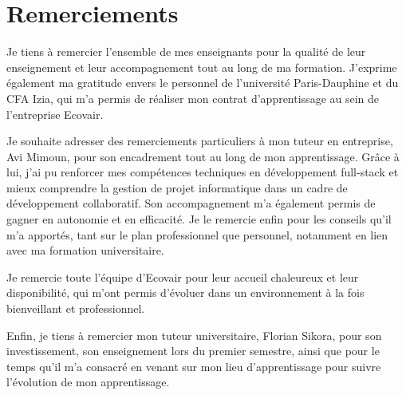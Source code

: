 \section*{Remerciements}
Je tiens à remercier l’ensemble de mes enseignants pour la qualité de leur enseignement et leur accompagnement tout au long de ma formation. J’exprime également ma gratitude envers le personnel de l’université Paris-Dauphine et du CFA Izia, qui m’a permis de réaliser mon contrat d’apprentissage au sein de l’entreprise Ecovair.\vspace{0.2cm}

Je souhaite adresser des remerciements particuliers à mon tuteur en entreprise, Avi Mimoun, pour son encadrement tout au long de mon apprentissage.
Grâce à lui, j’ai pu renforcer mes compétences techniques en développement full-stack et mieux comprendre la gestion de projet informatique dans un cadre de développement collaboratif.
Son accompagnement m’a également permis de gagner en autonomie et en efficacité.
Je le remercie enfin pour les conseils qu’il m’a apportés, tant sur le plan professionnel que personnel, notamment en lien avec ma formation universitaire.\vspace{0.2cm}

Je remercie toute l’équipe d’Ecovair pour leur accueil chaleureux et leur disponibilité, qui m’ont permis d’évoluer dans un environnement à la fois bienveillant et professionnel.\vspace{0.2cm}

Enfin, je tiens à remercier mon tuteur universitaire, Florian Sikora, pour son investissement, son enseignement lors du premier semestre, ainsi que pour le temps qu’il m’a consacré en venant sur mon lieu d’apprentissage pour suivre l’évolution de mon apprentissage.